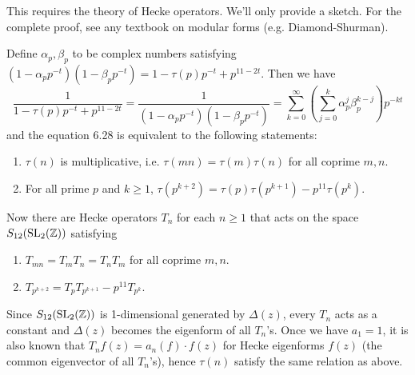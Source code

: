 \begin{problem} \notfinish
\end{problem}


\begin{problem} \notfinish
\end{problem}


\begin{problem} \notfinish
\end{problem}


\begin{problem}
This requires the theory of Hecke operators. We'll only provide a sketch.
For the complete proof, see any textbook on modular forms (e.g. Diamond-Shurman).

Define $\alpha_p, \beta_p$ to be complex numbers satisfying $(1 -\alpha_p p^{-t})(1 - \beta_p p^{-t}) = 1 - \tau(p)p^{-t} + p^{11 - 2t}$.
Then we have
$$
\frac{1}{1 - \tau(p)p^{-t} + p^{11 - 2t}} = \frac{1}{(1 - \alpha_p p^{-t})(1 - \beta_p p^{-t})} = \sum_{k=0}^{\infty} \left( \sum_{j=0}^{k} \alpha_p^{j} \beta_{p}^{k-j} \right)p^{-kt}
$$
and the equation 6.28 is equivalent to the following statements:
\begin{enumerate}
    \item $\tau(n)$ is multiplicative, i.e. $\tau(mn) = \tau(m)\tau(n)$ for all coprime $m, n$.
    \item For all prime $p$ and $k \geq 1$, $\tau(p^{k+2}) = \tau(p)\tau(p^{k+1}) - p^{11} \tau(p^{k})$.
\end{enumerate}
Now there are Hecke operators $T_n$ for each $n \geq 1$ that acts on the space $S_{12}(\operatorname{\mathrm{SL}}_2(\mathbb{Z}))$ satisfying
\begin{enumerate}
    \item $T_{mn} = T_{m}T_{n} = T_{n}T_{m}$ for all coprime $m, n$.
    \item $T_{p^{k+2}} = T_{p}T_{p^{k+1}} - p^{11}T_{p^k}$.
\end{enumerate}
Since $S_{12}(\operatorname{\mathrm{SL}}_2(\mathbb{Z}))$ is 1-dimensional generated by $\Delta(z)$,  every $T_n$ acts as a constant and $\Delta(z)$ becomes
the eigenform of all $T_n$'s. Once we have $a_1 =1$, it is also known that $T_n f(z) = a_n(f)\cdot f(z)$
for Hecke eigenforms $f(z)$ (the common eigenvector of all $T_n$'s), hence $\tau(n)$ satisfy the same relation as above.

\end{problem}


\begin{problem} \notfinish
\end{problem}
